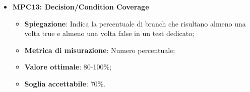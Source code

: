 \begin{itemize}
    \item \textbf{MPC13: Decision/Condition Coverage}
    \begin{itemize}
        \item \textbf{Spiegazione}: Indica la percentuale di branch che risultano almeno una volta true e almeno una volta false in un test dedicato;
        \item \textbf{Metrica di misurazione}: Numero percentuale;
        \item \textbf{Valore ottimale}: 80-100\%;
        \item \textbf{Soglia accettabile}: 70\%.
    \end{itemize}
\end{itemize}

